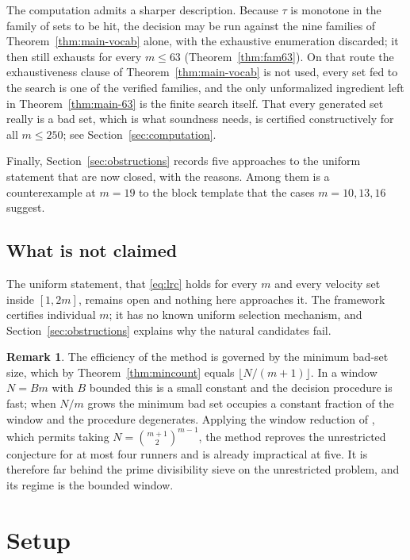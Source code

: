 \documentclass[11pt]{amsart}
\theoremstyle{plain}
\theoremstyle{definition}
\newtheorem{remark}[theorem]{Remark}
\begin{document}
The computation admits a sharper description. Because $\tau$ is monotone in the family of sets to be
hit, the decision may be run against the nine families of Theorem~\ref{thm:main-vocab} alone, with
the exhaustive enumeration discarded; it then still exhausts for every $m \le 63$
(Theorem~\ref{thm:fam63}). On that route the exhaustiveness clause of Theorem~\ref{thm:main-vocab}
is not used, every set fed to the search is one of the verified families, and the only unformalized
ingredient left in Theorem~\ref{thm:main-63} is the finite search itself. That every generated set
really is a bad set, which is what soundness needs, is certified constructively for all
$m \le 250$; see Section~\ref{sec:computation}.

Finally, Section~\ref{sec:obstructions} records five approaches to the uniform statement that are
now closed, with the reasons. Among them is a counterexample at $m = 19$ to the block template that
the cases $m = 10,13,16$ suggest.

\subsection{What is not claimed}

The uniform statement, that \eqref{eq:lrc} holds for every $m$ and every velocity set inside
$[1,2m]$, remains open and nothing here approaches it. The framework certifies individual $m$; it
has no known uniform selection mechanism, and Section~\ref{sec:obstructions} explains why the
natural candidates fail.

\begin{remark}\label{rem:regime}
The efficiency of the method is governed by the minimum bad-set size, which by
Theorem~\ref{thm:mincount} equals $\lfloor N/(m+1) \rfloor$. In a window $N = Bm$ with $B$ bounded
this is a small constant and the decision procedure is fast; when $N/m$ grows the minimum bad set
occupies a constant fraction of the window and the procedure degenerates. Applying the window
reduction of \cite{MSS}, which permits taking $N = \binom{m+1}{2}^{m-1}$, the method reproves the
unrestricted conjecture for at most four runners and is already impractical at five. It is
therefore far behind the prime divisibility sieve on the unrestricted problem, and its regime is
the bounded window.
\end{remark}

\section{Setup}\label{sec:setup}
\end{document}
